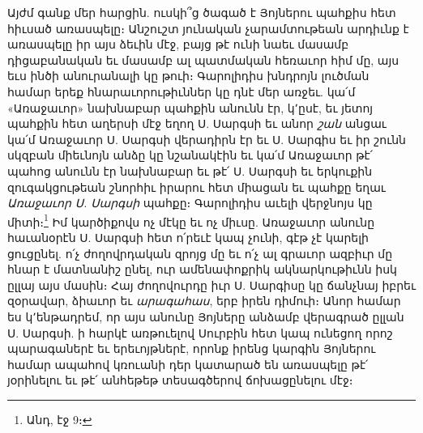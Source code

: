 \documentclass{article}
\begin{document}
{Այժմ գանք մեր հարցին. ուսկի՞ց ծագած է Յոյներու պահքիս հետ հիւսած առասպելը։ Անշուշտ յունական չարամտութեան արդիւնք է առասպելը իր այս ձեւին մէջ, բայց թէ ունի նաեւ մասամբ դիցաբանական եւ մասամբ ալ պատմական հեռաւոր հիմ մը, այս եւս ինծի անուրանալի կը թուի։ Գարոլիդիս խնդրոյն լուծման համար երեք հնարաւորութիւններ կը դնէ մեր առջեւ. կա՛մ «Առաջաւոր» նախնաբար պահքին անունն էր, կ՚ըսէ, եւ յետոյ պահքին հետ աղերսի մէջ եղող Ս. Սարգսի եւ անոր \emph{շան} անցաւ կա՛մ Առաջաւոր Ս. Սարգսի վերադիրն էր եւ Ս. Սարգիս եւ իր շունն սկզբան միեւնոյն անձը կը նշանակէին եւ կա՛մ Առաջաւոր թէ՛ պահոց անունն էր նախնաբար եւ թէ՛ Ս. Սարգսի եւ երկուքին զուգակցութեան շնորհիւ իրարու հետ միացան եւ պահքը եղաւ \emph{Առաջաւոր Ս. Սարգսի} պահքը։ Գարոլիդիս աւելի վերջնոյս կը միտի։\footnote{Անդ, էջ 9։} Իմ կարծիքովս ոչ մէկը եւ ոչ միւսը. Առաջաւոր անունը հաւանօրէն Ս. Սարգսի հետ ո՛րեւէ կապ չունի, գէթ չէ կարելի ցուցընել. ո՛չ ժողովրդական զրոյց մը եւ ո՛չ ալ գրաւոր ազբիւր մը հնար է մատնանիշ ընել, ուր ամենափոքրիկ ակնարկութիւնն իսկ ըլլայ այս մասին։ Հայ ժողովուրդը իւր Ս. Սարգիսը կը ճանչնայ իբրեւ զօրավար, ձիաւոր եւ \emph{արագահաս}, երբ իրեն դիմուի։ Անոր համար ես կ՚ենթադրեմ, որ այս անունը Յոյները անձամբ վերագրած ըլլան Ս. Սարգսի. ի հարկէ առթուելով Սուրբին հետ կապ ունեցող որոշ պարագաներէ եւ երեւոյթներէ, որոնք իրենց կարգին Յոյներու համար ապահով կռուանի դեր կատարած են առասպելը թէ՛ յօրինելու եւ թէ՛ անհեթեթ տեսագծերով ճոխացընելու մէջ։

}
\end{document}
